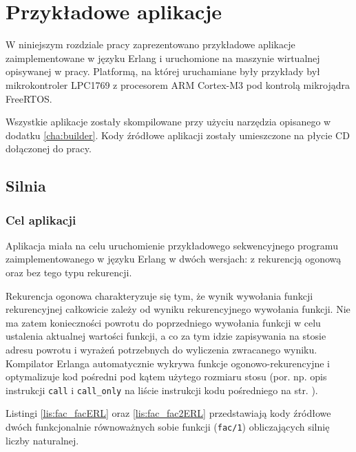 \chapter{Przykładowe aplikacje}
\label{cha:przyklady}

W niniejszym rozdziale pracy zaprezentowano przykładowe aplikacje zaimplementowane w języku Erlang i uruchomione na maszynie wirtualnej opisywanej w pracy. Platformą, na której uruchamiane były przykłady był mikrokontroler LPC1769 z procesorem ARM Cortex-M3 pod kontrolą mikrojądra FreeRTOS.

Wszystkie aplikacje zostały skompilowane przy użyciu narzędzia opisanego w dodatku \ref{cha:builder}. Kody źródłowe aplikacji zostały umieszczone na płycie CD dołączonej do pracy.

\section{Silnia}
\label{sec:przykladySilnia}

\subsection{Cel aplikacji}

Aplikacja miała na celu uruchomienie przykładowego sekwencyjnego programu zaimplementowanego w języku Erlang w dwóch wersjach: z rekurencją ogonową oraz bez tego typu rekurencji.

Rekurencja ogonowa charakteryzuje się tym, że wynik wywołania funkcji rekurencyjnej całkowicie zależy od wyniku rekurencyjnego wywołania funkcji.
Nie ma zatem konieczności powrotu do poprzedniego wywołania funkcji w celu ustalenia aktualnej wartości funkcji, a co za tym idzie zapisywania na stosie adresu powrotu i wyrażeń potrzebnych do wyliczenia zwracanego wyniku.
Kompilator Erlanga automatycznie wykrywa funkcje ogonowo-rekurencyjne i optymalizuje kod pośredni pod kątem użytego rozmiaru stosu (por. np. opis instrukcji \texttt{call} i \texttt{call\_only} na liście instrukcji kodu pośredniego na str. \pageref{sec:opsOps}).

Listingi \ref{lis:fac_facERL} oraz \ref{lis:fac_fac2ERL} przedstawiają kody źródłowe dwóch funkcjonalnie równoważnych sobie funkcji (\texttt{fac/1}) obliczających silnię liczby naturalnej.

